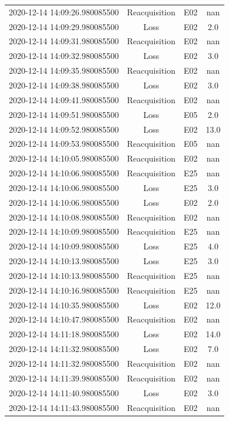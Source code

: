 \begin{enumerate}
\begin{longtabu}{cccc}
2020{-}12{-}14 14:09:26.980085500&Reacquisition&E02&nan\\%
2020{-}12{-}14 14:09:29.980085500&Loss&E02&2.0\\%
2020{-}12{-}14 14:09:31.980085500&Reacquisition&E02&nan\\%
2020{-}12{-}14 14:09:32.980085500&Loss&E02&3.0\\%
2020{-}12{-}14 14:09:35.980085500&Reacquisition&E02&nan\\%
2020{-}12{-}14 14:09:38.980085500&Loss&E02&3.0\\%
2020{-}12{-}14 14:09:41.980085500&Reacquisition&E02&nan\\%
2020{-}12{-}14 14:09:51.980085500&Loss&E05&2.0\\%
2020{-}12{-}14 14:09:52.980085500&Loss&E02&13.0\\%
2020{-}12{-}14 14:09:53.980085500&Reacquisition&E05&nan\\%
2020{-}12{-}14 14:10:05.980085500&Reacquisition&E02&nan\\%
2020{-}12{-}14 14:10:06.980085500&Reacquisition&E25&nan\\%
2020{-}12{-}14 14:10:06.980085500&Loss&E25&3.0\\%
2020{-}12{-}14 14:10:06.980085500&Loss&E02&2.0\\%
2020{-}12{-}14 14:10:08.980085500&Reacquisition&E02&nan\\%
2020{-}12{-}14 14:10:09.980085500&Reacquisition&E25&nan\\%
2020{-}12{-}14 14:10:09.980085500&Loss&E25&4.0\\%
2020{-}12{-}14 14:10:13.980085500&Loss&E25&3.0\\%
2020{-}12{-}14 14:10:13.980085500&Reacquisition&E25&nan\\%
2020{-}12{-}14 14:10:16.980085500&Reacquisition&E25&nan\\%
2020{-}12{-}14 14:10:35.980085500&Loss&E02&12.0\\%
2020{-}12{-}14 14:10:47.980085500&Reacquisition&E02&nan\\%
2020{-}12{-}14 14:11:18.980085500&Loss&E02&14.0\\%
2020{-}12{-}14 14:11:32.980085500&Loss&E02&7.0\\%
2020{-}12{-}14 14:11:32.980085500&Reacquisition&E02&nan\\%
2020{-}12{-}14 14:11:39.980085500&Reacquisition&E02&nan\\%
2020{-}12{-}14 14:11:40.980085500&Loss&E02&3.0\\%
2020{-}12{-}14 14:11:43.980085500&Reacquisition&E02&nan\\%

\end{longtabu}
\end{enumerate}
